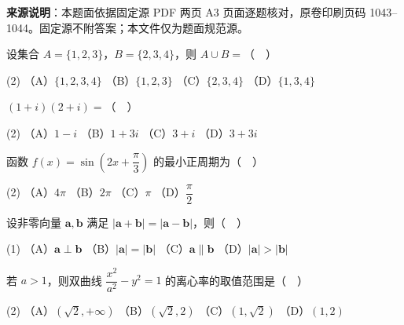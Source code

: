 


\begin{gktip}
\textbf{来源说明}：本题面依据固定源 PDF 两页 A3 页面逐题核对，原卷印刷页码 1043–1044。固定源不附答案；本文件仅为题面规范源。
\end{gktip}


\begin{question}
设集合 \(A=\{1,2,3\}\)，\(B=\{2,3,4\}\)，则 \(A\cup B=\)（　）

\begin{gkopts}(2)
\task （A）\(\{1,2,3,4\}\)
\task （B）\(\{1,2,3\}\)
\task （C）\(\{2,3,4\}\)
\task （D）\(\{1,3,4\}\)
\end{gkopts}

\end{question}
\begin{question}
\((1+i)(2+i)=\)（　）

\begin{gkopts}(2)
\task （A）\(1-i\)
\task （B）\(1+3i\)
\task （C）\(3+i\)
\task （D）\(3+3i\)
\end{gkopts}

\end{question}
\begin{question}
函数 \(f(x)=\sin\left(2x+\dfrac{\pi}{3}\right)\) 的最小正周期为（　）

\begin{gkopts}(2)
\task （A）\(4\pi\)
\task （B）\(2\pi\)
\task （C）\(\pi\)
\task （D）\(\dfrac{\pi}{2}\)
\end{gkopts}

\end{question}
\begin{question}
设非零向量 \(\boldsymbol a,\boldsymbol b\) 满足 \(|\boldsymbol a+\boldsymbol b|=|\boldsymbol a-\boldsymbol b|\)，则（　）

\begin{gkopts}(1)
\task （A）\(\boldsymbol a\perp\boldsymbol b\)
\task （B）\(|\boldsymbol a|=|\boldsymbol b|\)
\task （C）\(\boldsymbol a\parallel\boldsymbol b\)
\task （D）\(|\boldsymbol a|>|\boldsymbol b|\)
\end{gkopts}

\end{question}
\begin{question}
若 \(a>1\)，则双曲线 \(\dfrac{x^2}{a^2}-y^2=1\) 的离心率的取值范围是（　）

\begin{gkopts}(2)
\task （A）\((\sqrt2,+\infty)\)
\task （B）\((\sqrt2,2)\)
\task （C）\((1,\sqrt2)\)
\task （D）\((1,2)\)
\end{gkopts}

\Needspace{0.4\textheight}
\end{question}
